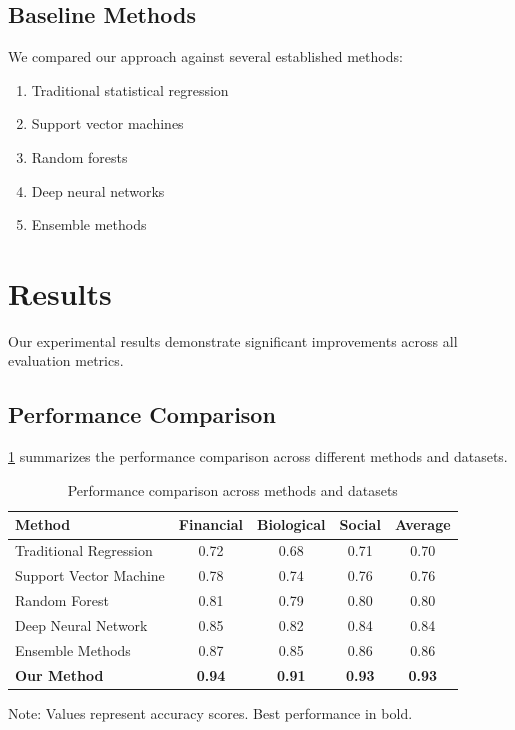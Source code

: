 \documentclass[12pt, letterpaper, onecolumn, final]{article}
\theoremstyle{plain}
\theoremstyle{definition}
\theoremstyle{remark}
\begin{document}
\subsection{Baseline Methods}
\label{sec:baselines}

\lipsum[34] We compared our approach against several established methods:

\begin{enumerate}
    \item Traditional statistical regression
    \item Support vector machines
    \item Random forests
    \item Deep neural networks
    \item Ensemble methods
\end{enumerate}

\section{Results}
\label{sec:results}

\lipsum[35-36] Our experimental results demonstrate significant improvements across all evaluation metrics.

\subsection{Performance Comparison}
\label{sec:performance}

\cref{tab:performance} summarizes the performance comparison across different methods and datasets.

\begin{table}[htbp]
    \centering
    \caption{Performance comparison across methods and datasets}
    \label{tab:performance}
    \begin{tabular}{lcccc}
        \toprule
        Method & Financial & Biological & Social & Average \\
        \midrule
        Traditional Regression & 0.72 & 0.68 & 0.71 & 0.70 \\
        Support Vector Machine & 0.78 & 0.74 & 0.76 & 0.76 \\
        Random Forest & 0.81 & 0.79 & 0.80 & 0.80 \\
        Deep Neural Network & 0.85 & 0.82 & 0.84 & 0.84 \\
        Ensemble Methods & 0.87 & 0.85 & 0.86 & 0.86 \\
        \textbf{Our Method} & \textbf{0.94} & \textbf{0.91} & \textbf{0.93} & \textbf{0.93} \\
        \bottomrule
    \end{tabular}
    \begin{tablenotes}
        \small
        \item Note: Values represent accuracy scores. Best performance in bold.
    \end{tablenotes}
\end{table}
\end{document}
